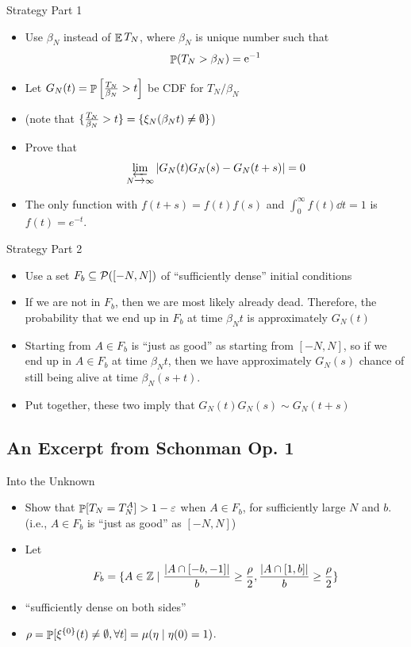 \documentclass{beamer}
\newcommand{\ep}{\varepsilon}
\begin{document}
\begin{frame}{Strategy Part 1}
  \begin{itemize}
    \item Use $\beta_{N}$ instead of $\mathop{\mathbb{E}} T_{N}$, where $\beta_{N}$ is unique number such that
    \[ \mathop{\mathbb{P}}(T_{N} > \beta_{N}) = \mathrm{e}^{-1} \]
          \pause
    \item Let $G_{N}(t) = \mathop{\mathbb{P}}\left[ \frac{T_{N}}{\beta_{N}} > t\right]$ be CDF for $T_{N} / \beta_{N}$
          \pause
    \item(note that $\{ \frac{T_N}{\beta_N} > t\} = \{\xi_{N}(\beta_{N}t) \neq \emptyset\}$)
          \pause
    \item Prove that
          \[ \limas_{N \to \infty} \abs{G_{N}(t)G_{N}(s) - G_{N}(t+s)} = 0 \]
    \item The only function with $f(t+s) = f(t)f(s)$ and $\int_{0}^{\infty} f(t) \dd{t} = 1$ is $f(t) = e^{-t}$.
  \end{itemize}
\end{frame}

\begin{frame}{Strategy Part 2}
  \begin{itemize}
    \item Use a set $F_{b} \subseteq \mathcal{P}([-N,N])$ of ``sufficiently dense'' initial conditions
    \pause
    \item If we are not in $F_{b}$, then we are most likely already dead. Therefore, the probability that we end up in $F_{b}$ at time $\beta_{N}t$ is approximately $G_{N}(t)$
    \pause
    \item Starting from $A \in F_{b}$ is ``just as good'' as starting from $[-N,N]$, so if we end up in $A \in F_{b}$ at time $\beta_{N}t$, then we have approximately $G_{N}(s)$ chance of still being alive at time $\beta_{N}(s+t)$.
    \pause
    \item Put together, these two imply that $G_{N}(t)G_{N}(s) \sim G_{N}(t+s)$
  \end{itemize}
\end{frame}

\subsection{An Excerpt from Schonman Op. 1}

\begin{frame}{Into the Unknown}
  \begin{itemize}
    \item Show that $\Prob[T_{N} = T_{N}^{A}] > 1 - \ep$ when $A \in F_{b}$, for sufficiently large $N$ and $b$. (i.e., $A \in F_{b}$ is ``just as good'' as $[-N,N]$)
    \item Let
          \[F_{b} = \{A \in \mathbb{Z} \mid \frac{\abs{A \cap [-b,-1]}}{b} \geq \frac{\rho}{2}, \frac{\abs{A \cap [1,b]}}{b} \geq \frac{\rho}{2}\}\]
    \item ``sufficiently dense on both sides''
    \item $\rho = \mathop{\mathbb{P}}[\xi^{\{0\}}(t) \neq \emptyset, \forall t] = \mu(\eta \mid \eta(0) = 1)$.
  \end{itemize}
\end{frame}
\end{document}
